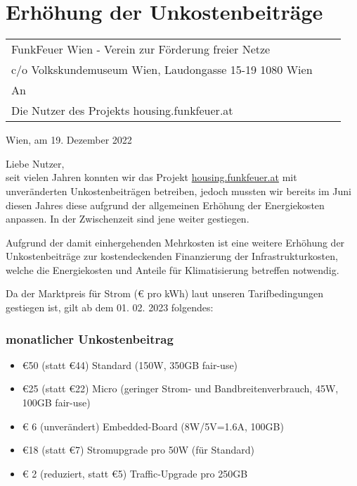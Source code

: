 \documentclass[parskip=half]{scrreprt}
\begin{document}
\vspace{4cm}
\chapter*{Erhöhung der Unkostenbeiträge}
\thispagestyle{fancy}

\begin{tabular}{p{8cm}p{}l}

	\vspace{1cm}

	{\scriptsize FunkFeuer Wien - Verein zur Förderung freier Netze}\\
	\vspace{-1em}
	{\scriptsize c/o Volkskundemuseum Wien, Laudongasse 15-19 1080 Wien}\\
	An\\
	Die Nutzer des Projekts housing.funkfeuer.at

\end{tabular}
\begin{flushright}
Wien, am 19. Dezember 2022
\end{flushright}
\vspace{0.5cm}

Liebe Nutzer, \\

seit vielen Jahren konnten wir das Projekt \href{https://housing.funkfeuer.at}{housing.funkfeuer.at} mit unveränderten Unkostenbeiträgen betreiben, jedoch mussten wir bereits im Juni diesen Jahres diese aufgrund der allgemeinen Erhöhung der Energiekosten anpassen. In der Zwischenzeit sind jene weiter gestiegen.

Aufgrund der damit einhergehenden Mehrkosten ist eine weitere Erhöhung der Unkostenbeiträge zur kostendeckenden Finanzierung der Infrastrukturkosten, welche die Energiekosten und Anteile für Klimatisierung betreffen notwendig.

Da der Marktpreis für Strom (€ pro kWh) laut unseren Tarifbedingungen gestiegen ist, gilt ab dem 01. 02. 2023 folgendes:

\subsection*{monatlicher Unkostenbeitrag}
\begin{itemize}
	\item €50 (statt €44) Standard (150W, 350GB fair-use)
	\item €25 (statt €22) Micro (geringer Strom- und Bandbreitenverbrauch, 45W, 100GB fair-use)
	\item € 6 (unverändert) Embedded-Board (8W/5V=1.6A, 100GB)
	\item €18 (statt €7) Stromupgrade pro 50W (für Standard)
	\item € 2 (reduziert, statt €5) Traffic-Upgrade pro 250GB
\end{itemize}
\end{document}
